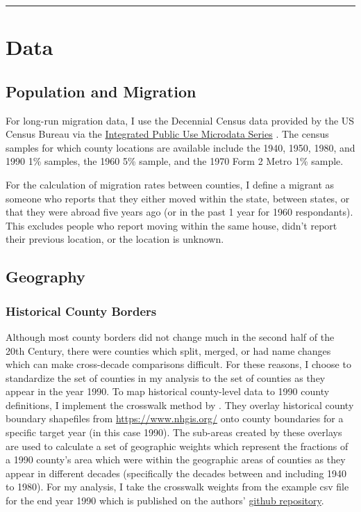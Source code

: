 \documentclass[12pt]{article}
\begin{document}
\begin{center}\rule{0.5\linewidth}{0.5pt}\end{center}

\section{Data}\label{data}


\subsection{Population and Migration}\label{population-and-migration}

For long-run migration data, I use the Decennial Census data provided by
the US Census Bureau via the
\href{https://usa.ipums.org/usa/index.shtml}{Integrated Public Use
Microdata Series} \citep{ruggles_ipums_2024}. The census
samples for which county locations are available include the 1940, 1950,
1980, and 1990 1\% samples, the 1960 5\% sample, and the 1970 Form 2
Metro 1\% sample.

For the calculation of migration rates between counties, I define a
migrant as someone who reports that they either moved within the state,
between states, or that they were abroad five years ago (or in the past
1 year for 1960 respondants). This excludes people who report moving
within the same house, didn't report their previous location, or the
location is unknown.

\subsection{Geography}\label{geography}

\subsubsection{Historical County Borders}\label{historical-county-borders}

Although most county borders did not change much in the second half of
the 20th Century, there were counties which split, merged, or had name
changes which can make cross-decade comparisons difficult. For these
reasons, I choose to standardize the set of counties in my analysis to
the set of counties as they appear in the year 1990. To map historical
county-level data to 1990 county definitions, I implement the crosswalk
method by \cite{eckert_method_2020}. They overlay historical
county boundary shapefiles from \href{NHGIS}{https://www.nhgis.org/}
onto county boundaries for a specific target year (in this case 1990).
The sub-areas created by these overlays are used to calculate a set of
geographic weights which represent the fractions of a 1990 county's area
which were within the geographic areas of counties as they appear in
different decades (specifically the decades between and including 1940
to 1980). For my analysis, I take the crosswalk weights from the example
csv file for the end year 1990 which is published on the authors'
\href{https://github.com/liang-jack-a/EGLP_Crosswalk/tree/master}{github
repository}.
\end{document}
